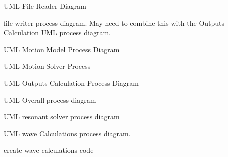 
\begin{DoxyRefList}
\item[\label{todo__todo000001}%
\hypertarget{todo__todo000001}{}%
Page \hyperlink{_u_m_l__file_reader}{File Reader Process} ]U\-M\-L File Reader Diagram 
\item[\label{todo__todo000008}%
\hypertarget{todo__todo000008}{}%
Page \hyperlink{_u_m_l__writing_files}{File Writer Process} ]file writer process diagram. May need to combine this with the Outputs Calculation U\-M\-L process diagram. 
\item[\label{todo__todo000002}%
\hypertarget{todo__todo000002}{}%
Page \hyperlink{_u_m_l__motion_model}{Motion Model Process} ]U\-M\-L Motion Model Process Diagram 
\item[\label{todo__todo000003}%
\hypertarget{todo__todo000003}{}%
Page \hyperlink{_u_m_l__motion_solver}{Motion Solver Process} ]U\-M\-L Motion Solver Process 
\item[\label{todo__todo000004}%
\hypertarget{todo__todo000004}{}%
Page \hyperlink{_u_m_l__outputs_calculation}{Outputs Calculation} ]U\-M\-L Outputs Calculation Process Diagram 
\item[\label{todo__todo000005}%
\hypertarget{todo__todo000005}{}%
Page \hyperlink{_u_m_l__overall}{Overall Process} ]U\-M\-L Overall process diagram 
\item[\label{todo__todo000006}%
\hypertarget{todo__todo000006}{}%
Page \hyperlink{_u_m_l__resonant_solver}{Resonant Solver Process} ]U\-M\-L resonant solver process diagram 
\item[\label{todo__todo000007}%
\hypertarget{todo__todo000007}{}%
Page \hyperlink{_u_m_l__wave_calculation}{Wave Calculations Process} ]U\-M\-L wave Calculations process diagram. 

create wave calculations code
\end{DoxyRefList}